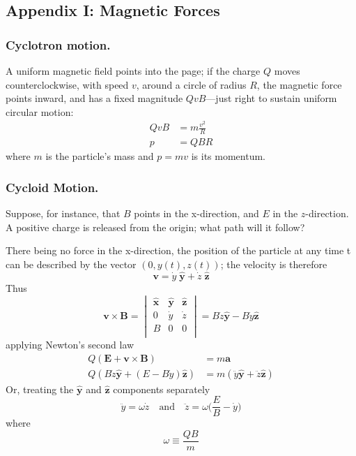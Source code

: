 \documentclass[../../../main.tex]{subfiles}
\begin{document}
\subsection*{Appendix I: Magnetic Forces}
\subsubsection*{Cyclotron motion.} A uniform magnetic field points into the page; if the charge $Q$ moves counterclockwise, with speed $v$, around a circle of radius $R$, the magnetic force points inward, and has a fixed magnitude $Qv B$—just right to sustain uniform circular motion:
\begin{align*}
    Qv B&=m\frac{v^2}{R}\\
    p&=QBR
\end{align*}
where $m$ is the particle’s mass and $p = mv$ is its momentum. 

\subsubsection*{Cycloid Motion.} Suppose, for instance, that $B$ points in the x-direction, and $E$ in the $z$-direction. A positive charge is released from the origin; what path will it follow?

There being no force in the x-direction, the position of the particle at any time t can be described by the vector $(0, y(t), z(t))$; the velocity is therefore
\begin{equation*}
    \mathbf{v} = \dot{y}\;\mathbf{\hat{y}}+ \dot{z}\;\mathbf{\hat{z}}
\end{equation*}
Thus
\begin{equation*}
    \mathbf{v}\times \mathbf{B}=\begin{vmatrix}
        \mathbf{\hat{x}}&\mathbf{\hat{y}}&\mathbf{\hat{z}}\\
        0& \dot{y}& \dot{z}\\
        B &0& 0\\
    \end{vmatrix}=
    B \dot{z}\mathbf{\hat{y}}-B\dot{y}\mathbf{\hat{z}}
\end{equation*}
applying Newton’s second law
\begin{align*}
    Q(\mathbf{E} + \mathbf{v} \times \mathbf{B}) &= m\mathbf{a}\\
    Q(B \dot{z}\mathbf{\hat{y}}+(E-B\dot{y})\mathbf{\hat{z}})&=m(\ddot{y}\mathbf{\hat{y}}+ \ddot{z}\mathbf{\hat{z}})
\end{align*}
Or, treating the $\mathbf{\hat{y}}$ and $\mathbf{\hat{z}}$ components separately
\begin{equation*}
    \ddot{y}=\omega \dot{z}\quad\text{and}\quad    \ddot{z}=\omega\biggl(\frac{E}{B}-\dot{y}\biggr)
\end{equation*}
where
\begin{equation*}
    \omega\equiv\frac{QB}{m}
\end{equation*}
\end{document}
